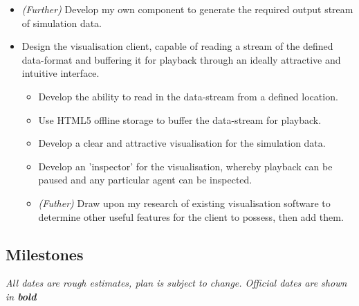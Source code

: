 \documentclass[a4paper]{article}
\begin{document}
\begin{itemize}
\begin{itemize}
					\end{itemize}

				\item \textit{(Further)} Develop my own component to generate the required output stream of simulation data.

				\item Design the visualisation client, capable of reading a stream of the defined data-format and buffering it for playback through an ideally attractive and intuitive interface.

					\begin{itemize}

						\item Develop the ability to read in the data-stream from a defined location.
						\item Use \textsc{HTML5} offline storage to buffer the data-stream for playback.
						\item Develop a clear and attractive visualisation for the simulation data.
						\item Develop an 'inspector' for the visualisation, whereby playback can be paused and any particular agent can be inspected.
						\item \textit{(Futher)} Draw upon my research of existing visualisation software to determine other useful features for the client to possess, then add them.

					\end{itemize}

			\end{itemize}

		\subsection{Milestones}

			\textit{\small{All dates are rough estimates, plan is subject to change. Official dates are shown in \textbf{bold}}}\\
\end{document}
